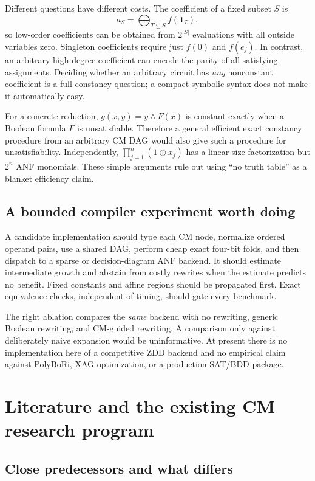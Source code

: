 Different questions have different costs. The coefficient of a fixed subset $S$ is
\begin{equation}\label{eq:coeffquery}
 a_S=\bigoplus_{T\subseteq S}f(\mathbf1_T),
\end{equation}
so low-order coefficients can be obtained from $2^{|S|}$ evaluations with all outside variables zero. Singleton coefficients require just $f(0)$ and $f(e_j)$. In contrast, an arbitrary high-degree coefficient can encode the parity of all satisfying assignments. Deciding whether an arbitrary circuit has \emph{any} nonconstant coefficient is a full constancy question; a compact symbolic syntax does not make it automatically easy.

For a concrete reduction, $g(x,y)=y\land F(x)$ is constant exactly when a Boolean formula $F$ is unsatisfiable. Therefore a general efficient exact constancy procedure from an arbitrary CM DAG would also give such a procedure for unsatisfiability. Independently, $\prod_{j=1}^n(1\oplus x_j)$ has a linear-size factorization but $2^n$ ANF monomials. These simple arguments rule out using ``no truth table'' as a blanket efficiency claim.

\subsection{A bounded compiler experiment worth doing}
A candidate implementation should type each CM node, normalize ordered operand pairs, use a shared DAG, perform cheap exact four-bit folds, and then dispatch to a sparse or decision-diagram ANF backend. It should estimate intermediate growth and abstain from costly rewrites when the estimate predicts no benefit. Fixed constants and affine regions should be propagated first. Exact equivalence checks, independent of timing, should gate every benchmark.

The right ablation compares the \emph{same} backend with no rewriting, generic Boolean rewriting, and CM-guided rewriting. A comparison only against deliberately naive expansion would be uninformative. At present there is no implementation here of a competitive ZDD backend and no empirical claim against PolyBoRi, XAG optimization, or a production SAT/BDD package.

\section{Literature and the existing CM research program}\label{sec:related}
\subsection{Close predecessors and what differs}
